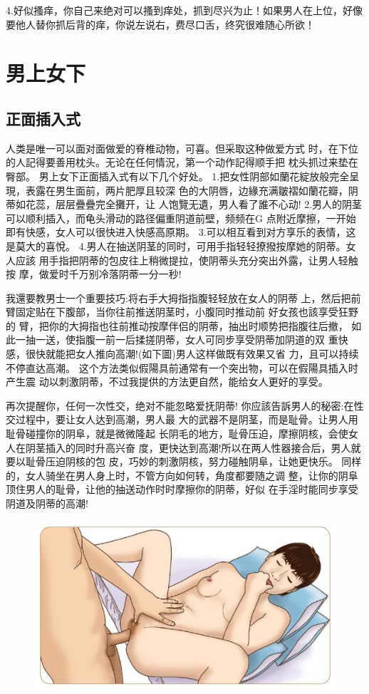 \documentclass[12pt,UTF8]{ctexbook}
\begin{document}
4.好似搔痒，你自己来绝对可以搔到痒处，抓到尽兴为止！如果男人在上位，好像要他人替你抓后背的痒，你说左说右，费尽口舌，终究很难随心所欲！

\section{男上女下}

\subsection{正面插入式}

人类是唯一可以面对面做爱的脊椎动物，可喜。但采取这种做爱方式
时，在下位的人記得要善用枕头。无论在任何情況，第一个动作記得顺手把
枕头抓过来垫在臀部。
男上女下正面插入式有以下几个好处。
1.把女性阴部如蘭花綻放般完全呈現，表露在男生面前，两片肥厚且较深
色的大阴唇，边緣充满皺褶如蘭花瓣，阴蒂如花蕊，层层疊疊完全攤开，让
人饱覽无遺，男人看了誰不心动!
2.男人的阴茎可以顺利插入，而龟头滑动的路径偏重阴道前壁，频频在G
点附近摩擦，一开始即有快感，女人可以很快进入快感高原期。
3.可以相互看到对方享乐的表情，这是莫大的喜悅。
4.男人在抽送阴茎的同时，可用手指轻轻撩撥按摩她的阴蒂。女人应該
用手指把阴蒂的包皮往上稍微提拉，使阴蒂头充分突出外露，让男人轻触按
摩，做爱时千万别冷落阴蒂一分一秒!

我還要教男士一个重要技巧:将右手大拇指指腹轻轻放在女人的阴蒂
上，然后把前臂固定贴在下腹部，当你往前推送阴茎时，小腹同时推动前
好女孩也該享受狂野的
臂，把你的大拇指也往前推动按摩伴侣的阴蒂，抽出时顺势把指腹往后撤，
如此一抽一送，使指腹一前一后揉搓阴蒂，女人可同步享受阴蒂加阴道的双
重快感，很快就能把女人推向高潮!(如下圖)男人这样做既有效果又省
力，且可以持续不停直达高潮。
这个方法类似假陽具前通常有一个突出物，可以在假陽具插入时产生震
动以刺激阴蒂，不过我提供的方法更自然，能给女人更好的享受。

再次提醒你，任何一次性交，绝对不能忽略爱抚阴蒂!
你应該告訴男人的秘密:在性交过程中，要让女人达到高潮，男人最
大的武器不是阴茎，而是耻骨。让男人用耻骨碰撞你的阴阜，就是微微隆起
长阴毛的地方，耻骨压迫，摩擦阴核，会使女人在阴茎插入的同时升高兴奋
度，更快达到高潮!所以在两人性器接合后，男人就要以耻骨压迫阴核的包
皮，巧妙的刺激阴核，努力碰触阴阜，让她更快乐。
同样的，女人骑坐在男人身上时，不管方向如何转，角度都要随之调
整，让你的阴阜顶住男人的耻骨，让他的抽送动作时时摩擦你的阴蒂，好似
在手淫时能同步享受阴道及阴蒂的高潮!

\begin{figure}[htbp]
	\centering
	\includegraphics[width=0.7\linewidth]{27}
	\caption{}
	\label{fig:1}
\end{figure}
\end{document}
